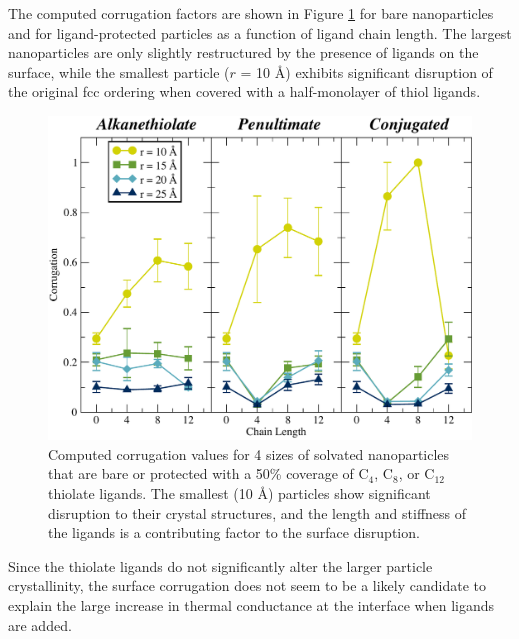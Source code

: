 The computed corrugation factors are shown in Figure
\ref{fig:NPthiols_corrugation} for bare nanoparticles and for
ligand-protected particles as a function of ligand chain length. The
largest nanoparticles are only slightly restructured by the presence
of ligands on the surface, while the smallest particle ($r$ = 10 \AA)
exhibits significant disruption of the original fcc ordering when
covered with a half-monolayer of thiol ligands.

\begin{figure}
  \includegraphics[width=\linewidth]{figures/C3.pdf}
  \caption{Computed corrugation values for 4 sizes of solvated
    nanoparticles that are bare or protected with a 50\% coverage of
    C$_{4}$, C$_{8}$, or C$_{12}$ thiolate ligands.  The smallest (10
    \AA ) particles show significant disruption to their crystal
    structures, and the length and stiffness of the ligands is a
    contributing factor to the surface disruption.}
  \label{fig:NPthiols_corrugation}
\end{figure}

Since the thiolate ligands do not significantly alter the larger
particle crystallinity, the surface corrugation does not seem to be a
likely candidate to explain the large increase in thermal conductance
at the interface when ligands are added.

% 




